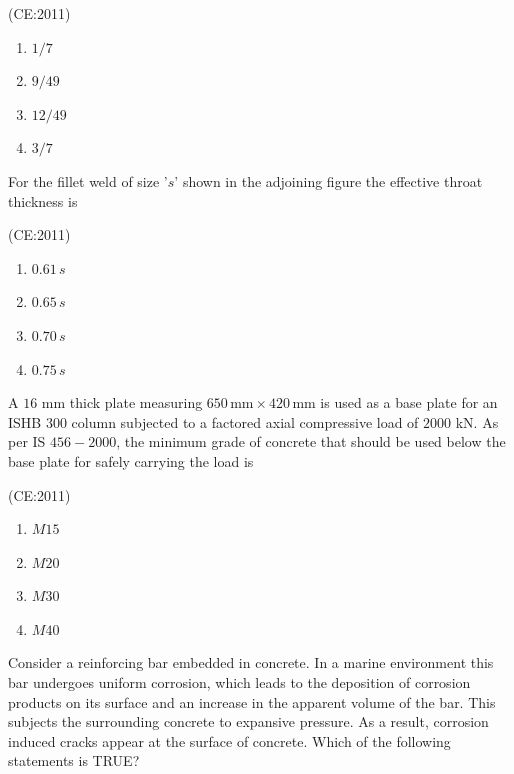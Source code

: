 		\hfill (CE:2011)
    \begin{multicols}{4}
        \begin{enumerate}
            \item $1/7$
            \item $9/49$
            \item $12/49$
            \item $3/7$
        \end{enumerate}
    \end{multicols}

    \item
	    For the fillet weld of size '$s$' shown in the adjoining figure the effective throat thickness is
		\begin{center}
		
		\end{center}

	    \hfill (CE:2011)
    \begin{multicols}{4}
        \begin{enumerate}
            \item $0.61 \, s$
            \item $0.65 \, s$
            \item $0.70 \, s$
            \item $0.75 \, s$
        \end{enumerate}
    \end{multicols}

    \item 
	    A $16$ mm thick plate measuring $650 \, \text{mm} \times 420 \, \text{mm}$ is used as a base plate for an ISHB $300$ column subjected to a factored axial compressive load of $2000$ kN. As per IS $456-2000$, the minimum grade of concrete that should be used below the base plate for safely carrying the load is 

		\hfill (CE:2011)
    \begin{multicols}{4}
        \begin{enumerate}
            \item $M15$
            \item $M20$
            \item $M30$
            \item $M40$
        \end{enumerate}
    \end{multicols} 
    
\item 
	Consider a reinforcing bar embedded in concrete. In a marine environment this bar undergoes uniform corrosion, which leads to the deposition of corrosion products on its surface and an increase in the apparent volume of the bar. This subjects the surrounding concrete to expansive pressure. As a result, corrosion induced cracks appear at the surface of concrete. Which of the following statements is TRUE? 

